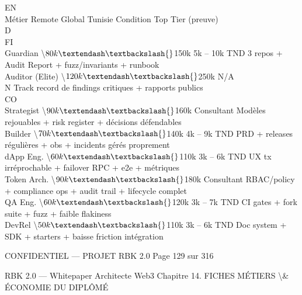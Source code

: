 EN\\
Métier          Remote Global Tunisie          Condition Top Tier (preuve)\\
\vspace{0.5em}
\vspace{0.5em}
\vspace{0.5em}
\vspace{0.5em}
D\\
FI\\
Guardian        \textbackslash{}$80k – \textbackslash{}$150k    5k – 10k TND 3 repos + Audit Report + fuzz/invariants + runbook\\
\vspace{0.5em}
Auditor (Elite) \textbackslash{}$120k – \textbackslash{}$250k N/A\\
N           Track record de findings critiques + rapports publics\\
CO\\
Strategist      \textbackslash{}$90k – \textbackslash{}$160k    Consultant     Modèles rejouables + risk register + décisions défendables\\
\vspace{0.5em}
Builder         \textbackslash{}$70k – \textbackslash{}$140k    4k – 9k TND    PRD + releases régulières + obs + incidents gérés proprement\\
\vspace{0.5em}
dApp Eng.       \textbackslash{}$60k – \textbackslash{}$110k    3k – 6k TND    UX tx irréprochable + failover RPC + e2e + métriques\\
\vspace{0.5em}
Token Arch.     \textbackslash{}$90k – \textbackslash{}$180k    Consultant     RBAC/policy + compliance ops + audit trail + lifecycle complet\\
\vspace{0.5em}
QA Eng.         \textbackslash{}$60k – \textbackslash{}$120k    3k – 7k TND    CI gates + fork suite + fuzz + faible flakiness\\
\vspace{0.5em}
DevRel          \textbackslash{}$50k – \textbackslash{}$110k    3k – 6k TND    Doc system + SDK + starters + baisse friction intégration\\
\vspace{0.5em}
\vspace{0.5em}
\vspace{0.5em}
\vspace{0.5em}
\begin{confidential}CONFIDENTIEL — PROJET RBK 2.0                                   Page 129 sur 316\end{confidential}
RBK 2.0 — Whitepaper Architecte Web3                                                   Chapitre 14. FICHES MÉTIERS \textbackslash{}& ÉCONOMIE DU DIPLÔMÉ\\
\vspace{0.5em}
\vspace{0.5em}
